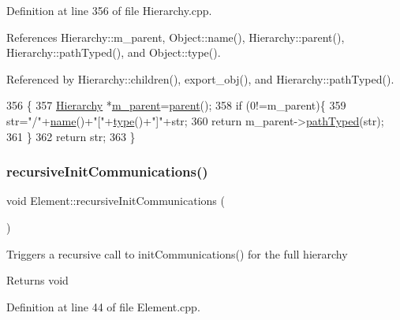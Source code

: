 Definition at line 356 of file Hierarchy.\+cpp.



References Hierarchy\+::m\+\_\+parent, Object\+::name(), Hierarchy\+::parent(), Hierarchy\+::path\+Typed(), and Object\+::type().



Referenced by Hierarchy\+::children(), export\+\_\+obj(), and Hierarchy\+::path\+Typed().


\begin{DoxyCode}
356                                            \{
357   \hyperlink{classHierarchy}{Hierarchy} *\hyperlink{classHierarchy_a5814bb280d4e8539ab25ab6cbfb9cc4f}{m\_parent}=\hyperlink{classHierarchy_a1c7bec8257e717f9c1465e06ebf845fc}{parent}();
358   \textcolor{keywordflow}{if} (0!=m\_parent)\{
359     str=\textcolor{stringliteral}{"/"}+\hyperlink{classObject_a300f4c05dd468c7bb8b3c968868443c1}{name}()+\textcolor{stringliteral}{"["}+\hyperlink{classObject_a84f99f70f144a83e1582d1d0f84e4e62}{type}()+\textcolor{stringliteral}{"]"}+str;
360     \textcolor{keywordflow}{return} m\_parent->\hyperlink{classHierarchy_a1efd56cd164d328d2002e53a10a19b8c}{pathTyped}(str);
361   \}
362   \textcolor{keywordflow}{return} str;
363 \}
\end{DoxyCode}
\mbox{\label{classElement_a82119ed37dff76508a2746a853ec35ba}} 
\subsubsection{\texorpdfstring{recursive\+Init\+Communications()}{recursiveInitCommunications()}}
{\footnotesize\ttfamily void Element\+::recursive\+Init\+Communications (\begin{DoxyParamCaption}{ }\end{DoxyParamCaption})\hspace{0.3cm}{\ttfamily [inherited]}}

Triggers a recursive call to init\+Communications() for the full hierarchy

\begin{DoxyReturn}{Returns}
void 
\end{DoxyReturn}


Definition at line 44 of file Element.\+cpp.



